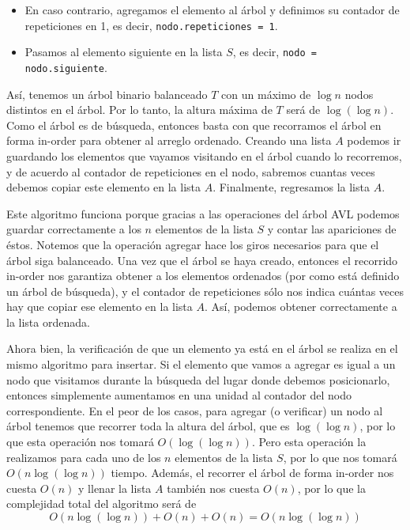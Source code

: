 \documentclass[letterpaper,11pt]{article}
\begin{document}
\begin{enumerate}
\begin{itemize}
\begin{enumerate}
\begin{itemize}
                \item En caso contrario, agregamos el elemento al árbol y 
                definimos su contador de repeticiones en 1, es decir, 
                \texttt{nodo.repeticiones = 1}.

                \item Pasamos al elemento siguiente en la lista $S$, es decir, 
                \texttt{nodo = nodo.siguiente}.
            \end{itemize}
        \end{enumerate}

        Así, tenemos un árbol binario balanceado $T$ con un máximo de 
        $\log n$ nodos distintos en el árbol. Por lo tanto, la altura máxima 
        de $T$ será de $\log (\log n)$. Como el árbol es de búsqueda, entonces 
        basta con que recorramos el árbol en forma in-order para obtener al 
        arreglo ordenado. Creando una lista $A$ podemos ir guardando los 
        elementos que vayamos visitando en el árbol cuando lo recorremos, y de 
        acuerdo al contador de repeticiones en el nodo, sabremos cuantas veces 
        debemos copiar este elemento en la lista $A$. Finalmente, regresamos
        la lista $A$.

        Este algoritmo funciona porque gracias a las operaciones del árbol 
        AVL podemos guardar correctamente a los $n$ elementos de la lista 
        $S$ y contar las apariciones de éstos. Notemos que la operación 
        agregar hace los giros necesarios para que el árbol siga balanceado.
        Una vez que el árbol se haya creado, entonces el recorrido in-order 
        nos garantiza obtener a los elementos ordenados (por como está 
        definido un árbol de búsqueda), y el contador de repeticiones sólo nos 
        indica cuántas veces hay que copiar ese elemento en la lista $A$.
        Así, podemos obtener correctamente a la lista ordenada.

        Ahora bien, la verificación de que un elemento ya está en el árbol se 
        realiza en el mismo algoritmo para insertar. Si el elemento que vamos 
        a agregar es igual a un nodo que visitamos durante la búsqueda del 
        lugar donde debemos posicionarlo, entonces simplemente aumentamos en 
        una unidad al contador del nodo correspondiente. En el peor de los 
        casos, para agregar (o verificar) un nodo al árbol tenemos que recorrer 
        toda la altura del árbol, que es $\log (\log n)$, por lo que esta 
        operación nos tomará $O(\log (\log n))$. Pero esta operación la 
        realizamos para cada uno de los $n$ elementos de la lista $S$, por lo 
        que nos tomará $O(n \log (\log n))$ tiempo. Además, el recorrer el 
        árbol de forma in-order nos cuesta $O(n)$ y llenar la lista $A$ también 
        nos cuesta $O(n)$, por lo que la complejidad total del algoritmo será 
        de 
        \begin{equation*}
            O(n \log (\log n)) + O(n) + O(n) = O(n \log (\log n))
        \end{equation*}


\end{itemize}
\end{enumerate}
\end{document}
